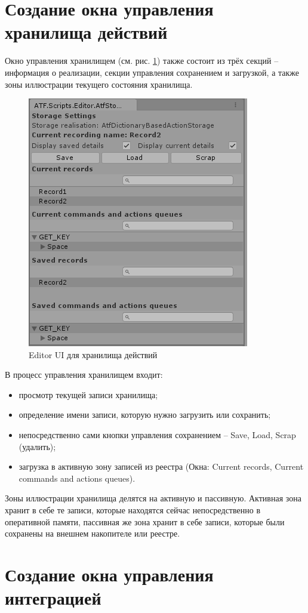 \section{Создание окна управления хранилища действий}
Окно управления хранилищем (см. рис. \ref{storageUI}) также состоит из трёх секций -- информация о реализации, секции управления сохранением и загрузкой, а также зоны иллюстрации текущего состояния хранилища.

\begin{figure}[h]
	\centering
	\includegraphics[width=0.7\linewidth]{storage.PNG}
	\caption{Editor UI для хранилища действий}
	\label{storageUI}
\end{figure}

В процесс управления хранилищем входит:
\begin{itemize}
	\item
	просмотр текущей записи хранилища;
	\item
	определение имени записи, которую нужно загрузить или сохранить; 
	\item
	непосредственно сами кнопки управления сохранением -- Save, Load, Scrap (удалить);
	\item
	загрузка в активную зону записей из реестра (Окна: Current records, Current commands and actions queues).
\end{itemize}
Зоны иллюстрации хранилища делятся на активную и пассивную. Активная зона хранит в себе те записи, которые находятся сейчас непосредственно в оперативной памяти, пассивная же зона хранит в себе записи, которые были сохранены на внешнем накопителе или реестре.

\section{Создание окна управления интеграцией}
